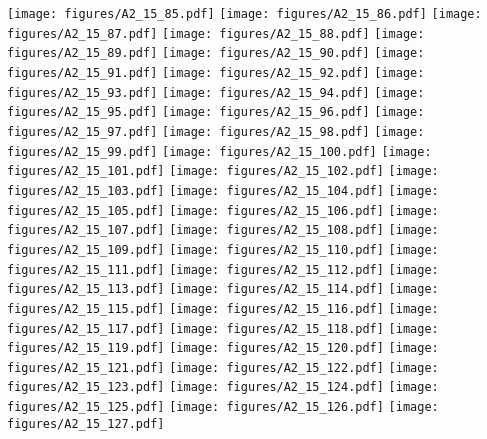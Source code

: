 \documentclass[12pt,a4paper]{article}
\begin{document}
\texttt{[image: figures/A2\_15\_85.pdf]}
\texttt{[image: figures/A2\_15\_86.pdf]}
\texttt{[image: figures/A2\_15\_87.pdf]}
\texttt{[image: figures/A2\_15\_88.pdf]}
\texttt{[image: figures/A2\_15\_89.pdf]}
\texttt{[image: figures/A2\_15\_90.pdf]}
\texttt{[image: figures/A2\_15\_91.pdf]}
\texttt{[image: figures/A2\_15\_92.pdf]}
\texttt{[image: figures/A2\_15\_93.pdf]}
\texttt{[image: figures/A2\_15\_94.pdf]}
\texttt{[image: figures/A2\_15\_95.pdf]}
\texttt{[image: figures/A2\_15\_96.pdf]}
\texttt{[image: figures/A2\_15\_97.pdf]}
\texttt{[image: figures/A2\_15\_98.pdf]}
\texttt{[image: figures/A2\_15\_99.pdf]}
\texttt{[image: figures/A2\_15\_100.pdf]}
\texttt{[image: figures/A2\_15\_101.pdf]}
\texttt{[image: figures/A2\_15\_102.pdf]}
\texttt{[image: figures/A2\_15\_103.pdf]}
\texttt{[image: figures/A2\_15\_104.pdf]}
\texttt{[image: figures/A2\_15\_105.pdf]}
\texttt{[image: figures/A2\_15\_106.pdf]}
\texttt{[image: figures/A2\_15\_107.pdf]}
\texttt{[image: figures/A2\_15\_108.pdf]}
\texttt{[image: figures/A2\_15\_109.pdf]}
\texttt{[image: figures/A2\_15\_110.pdf]}
\texttt{[image: figures/A2\_15\_111.pdf]}
\texttt{[image: figures/A2\_15\_112.pdf]}
\texttt{[image: figures/A2\_15\_113.pdf]}
\texttt{[image: figures/A2\_15\_114.pdf]}
\texttt{[image: figures/A2\_15\_115.pdf]}
\texttt{[image: figures/A2\_15\_116.pdf]}
\texttt{[image: figures/A2\_15\_117.pdf]}
\texttt{[image: figures/A2\_15\_118.pdf]}
\texttt{[image: figures/A2\_15\_119.pdf]}
\texttt{[image: figures/A2\_15\_120.pdf]}
\texttt{[image: figures/A2\_15\_121.pdf]}
\texttt{[image: figures/A2\_15\_122.pdf]}
\texttt{[image: figures/A2\_15\_123.pdf]}
\texttt{[image: figures/A2\_15\_124.pdf]}
\texttt{[image: figures/A2\_15\_125.pdf]}
\texttt{[image: figures/A2\_15\_126.pdf]}
\texttt{[image: figures/A2\_15\_127.pdf]}
\end{document}
